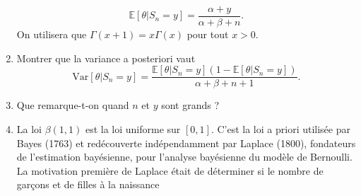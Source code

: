 \documentclass[a4paper,11pt,fleqn]{article}
\newcommand{\1}{\ensuremath{\mathbbm{1}}}
\begin{document}
\begin{enumerate}
\[                                                                                                                                                                                                                                                                                                                             
\mathbb{E} \left[ \theta \vert S_n = y \right] = \frac{\alpha + y}{\alpha + \beta + n}.                                                                                                                                                                                                                                              
\]
On utilisera que $\Gamma(x+1)=x\Gamma(x)$ pour tout $x>0$.
\item Montrer que la variance a posteriori vaut
\[                                                                                                                                                                                                                                                                                                                             
\mathrm{Var}[ \theta \vert S_n = y ] = \frac{\mathbb{E} [ \theta \vert S_n = y] (1 - \mathbb{E} [ \theta \vert S_n = y])}{\alpha+\beta+n+1}.                                                                                                                                                                                                       
\]
\item Que remarque-t-on quand $n$ et $y$ sont grands ?
\item La loi $\beta(1,1)$ est la loi uniforme sur $[0,1]$. C'est la loi a priori utilis\'ee par Bayes (1763) et red\'ecouverte
ind\'ependamment par Laplace (1800), fondateurs de l'estimation bay\'esienne, pour l'analyse bay\'esienne du mod\`ele
de Bernoulli. La motivation premi\`ere de Laplace \'etait de d\'eterminer si le nombre de gar\c cons et de filles \`a la naissance

\end{enumerate}
\end{document}
